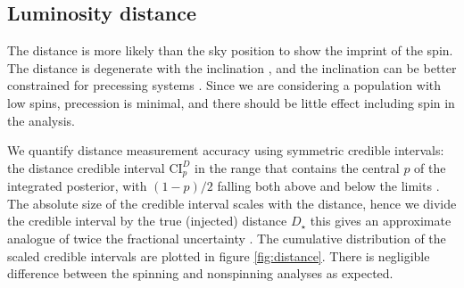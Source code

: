 \subsection{Luminosity distance}\label{sec:distance}

The distance is more likely than the sky position to show the imprint of the spin. The distance is degenerate with the inclination \citep{Cutler_1994,Aasi_2013}, and the inclination can be better constrained for precessing systems \citep{van_der_Sluys_2008,Vitale_2014}. Since we are considering a population with low spins, precession is minimal, and there should be little effect including spin in the analysis.

We quantify distance measurement accuracy using symmetric credible intervals: the distance credible interval $\mathrm{CI}_p^{D}$ in the range that contains the central $p$ of the integrated posterior, with $(1-p)/2$ falling both above and below the limits \citep{Aasi_2013}. The absolute size of the credible interval scales with the distance, hence we divide the credible interval by the true (injected) distance $D_\star$ this gives an approximate analogue of twice the fractional uncertainty \citep{Berry_2014}. The cumulative distribution of the scaled credible intervals are plotted in figure \ref{fig:distance}. There is negligible difference between the spinning and nonspinning analyses as expected.

